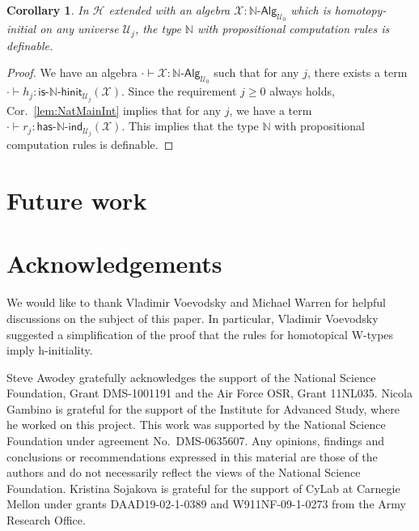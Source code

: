 \documentclass[11pt]{article}
\newcommand{\X}{\mathcal{X}}
\newcommand{\nat}{\ensuremath{\mathbb{N}}}
\newcommand{\UU}{\mathcal{U}}
\newcommand{\NatAlg}{\nat\text{-}\mathsf{Alg}}
\newcommand{\HasNatInd}{\mathsf{has}\text{-}\nat\text{-}\mathsf{ind}}
\newcommand{\IsNatHInit}{\mathsf{is}\text{-}\nat\text{-}\mathsf{hinit}}
\newcommand{\Hint}{\mathcal{H}}
\newtheorem{corollary}[theorem]{Corollary}
\theoremstyle{definition}
\begin{document}
\begin{corollary}\label{lem:NatCharInt}
In $\Hint$ extended with an algebra $\X : \NatAlg_{\UU_0}$ which is homotopy-initial on any universe $\UU_j$, the type $\nat$ with propositional computation rules is definable. 
\end{corollary}
\begin{proof}
We have an algebra $\cdot \vdash \X : \NatAlg_{\UU_0}$ such that for any $j$, there exists a term $\cdot \vdash h_j  : \IsNatHInit_{\UU_j}(\X)$. Since the requirement $j \geq 0$ always holds, Cor.~\ref{lem:NatMainInt} implies that for any $j$, we have a term $\cdot \vdash r_j : \HasNatInd_{\UU_j}(\X)$. This implies that the type $\nat$ with propositional computation rules is definable.
\end{proof}


\section{Future work}\label{section:future}



\section{Acknowledgements}

We would like to thank Vladimir Voevodsky and Michael Warren for helpful discussions
on the subject of this paper. In particular, Vladimir Voevodsky suggested a simplification of the 
proof that the rules for homotopical W-types imply h-initiality.

Steve Awodey gratefully acknowledges the support of the National Science Foundation, Grant DMS-1001191
 and the Air Force OSR, Grant 11NL035.
Nicola Gambino is grateful for the support of the Institute for Advanced Study, where
he worked on this project. This work was supported by the National Science Foundation 
under agreement No.\ DMS-0635607. Any opinions, findings and conclusions or recommendations
expressed in this material are those of the authors and do not necessarily reflect the views of
the National Science Foundation.
Kristina Sojakova is grateful for the support of CyLab at Carnegie
Mellon under grants DAAD19-02-1-0389 and W911NF-09-1-0273 from the Army
Research Office.






                        
\received{}{}{}
\end{document}
